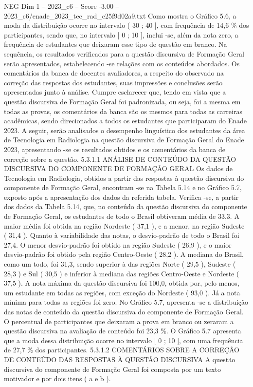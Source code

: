 \begin{textsample}{NEG Dim 1 – 2023\_c6 – Score -3.00 – 2023\_c6/enade\_2023\_tec\_rad\_e25f9d02a9.txt}
Como mostra o Gráfico 5.6, a moda da distribuição ocorre no intervalo ( 30 ; 40 ], com frequência de 14,6 \% dos participantes, sendo que, no intervalo [ 0 ; 10 ], inclui -se, além da nota zero, a frequência de estudantes que deixaram esse tipo de questão em branco.
Na sequência, os resultados verificados para a questão discursiva de Formação Geral serão apresentados, estabelecendo -se relações com os conteúdos abordados.
Os comentários da banca de docentes avaliadores, a respeito do observado na correção das respostas dos estudantes, suas impressões e conclusões serão apresentadas junto à análise.
Cumpre esclarecer que, tendo em vista que a questão discursiva de Formação Geral foi padronizada, ou seja, foi a mesma em todas as provas, os comentários da banca são os mesmos para todas as carreiras acadêmicas, sendo direcionados a todos os estudantes que participaram do Enade 2023.
A seguir, serão analisados o desempenho linguístico dos estudantes da área de Tecnologia em Radiologia na questão discursiva de Formação Geral do Enade 2023, apresentando -se os resultados obtidos e os comentários da banca de correção sobre a questão. 5.3.1.1 ANÁLISE DE CONTEÚDO DA QUESTÃO DISCURSIVA DO COMPONENTE DE FORMAÇÃO GERAL Os dados de Tecnologia em Radiologia, obtidos a partir das respostas à questão discursiva do componente de Formação Geral, encontram -se na Tabela 5.14 e no Gráfico 5.7, exposto após a apresentação dos dados da referida tabela.
Verifica -se, a partir dos dados da Tabela 5.14, que, no conteúdo da questão discursiva do componente de Formação Geral, os estudantes de todo o Brasil obtiveram média de 33,3.
A maior média foi obtida na região Nordeste ( 37,1 ), e a menor, na região Sudeste ( 31,4 ).
Quanto à variabilidade das notas, o desvio-padrão de todo o Brasil foi 27,4.
O menor desvio-padrão foi obtido na região Sudeste ( 26,9 ), e o maior desvio-padrão foi obtido pela região Centro-Oeste ( 28,2 ).
A mediana do Brasil, como um todo, foi 31,3, sendo superior à das regiões Norte ( 29,5 ), Sudeste ( 28,3 ) e Sul ( 30,5 ) e inferior à mediana das regiões Centro-Oeste e Nordeste ( 37,5 ).
A nota máxima da questão discursiva foi 100,0, obtida por, pelo menos, um estudante em todas as regiões, com exceção do Nordeste ( 93,0 ).
Já a nota mínima para todas as regiões foi zero.
No Gráfico 5.7, apresenta -se a distribuição das notas de conteúdo da questão discursiva do componente de Formação Geral.
O percentual de participantes que deixaram a prova em branco ou zeraram a questão discursiva na avaliação de conteúdo foi 23,3 \%.
O Gráfico 5.7 apresenta que a moda dessa distribuição ocorre no intervalo [ 0 ; 10 ], com uma frequência de 27,7 \% dos participantes. 5.3.1.2 COMENTÁRIOS SOBRE A CORREÇÃO DE CONTEÚDO DAS RESPOSTAS À QUESTÃO DISCURSIVA A questão discursiva do componente de Formação Geral foi composta por um texto motivador e por dois itens ( a e b ).

\end{textsample}
